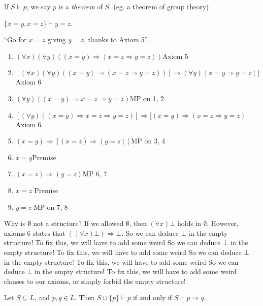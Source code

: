 \documentclass[a4paper]{article}
\begin{document}
\begin{defi}[Theorem]
  If $S\vdash p$, we say $p$ is a \emph{theorem} of $S$. (eg. a theorem of group theory)
\end{defi}

\begin{eg}
  $\{x = y, x = z\}\vdash y = z$.

  ``Go for $x = z$ giving $y = z$, thanks to Axiom 5''.

  \begin{enumerate}[label=\arabic{*}.]
    \item $(\forall x)(\forall y)((x = y)\Rightarrow (x = z\Rightarrow y=z))$\hfill Axiom 5
    \item $[(\forall x)(\forall y)((x = y)\Rightarrow (x = z\Rightarrow y=z))]\Rightarrow (\forall y)(x = y\Rightarrow y = z)]$ \hfill Axiom 6
    \item $(\forall y)((x = y) \Rightarrow  x = z \Rightarrow  y = z)$\hfill MP on 1, 2
    \item $[(\forall y)((x = y) \Rightarrow  x = z \Rightarrow  y = z)]\Rightarrow [(x = y)\Rightarrow (x = z\Rightarrow y = z)$\hfill Axiom 6
    \item $(x = y) \Rightarrow  [(x = z) \Rightarrow  (y = z)]$\hfill MP on 3, 4
    \item $x = y$\hfill Premise
    \item $(x = z) \Rightarrow  (y = z)$\hfill MP 6, 7
    \item $x = z$ \hfill Premise
    \item $y = z$ \hfill MP on 7, 8
  \end{enumerate}
\end{eg}
\note Why is $\emptyset$ not a structure? If we allowed $\emptyset$, then $(\forall x)\bot$ holds in $\emptyset$. However, axioms 6 states that $((\forall x)\bot )\Rightarrow \bot$. So we can deduce $\bot$ in the empty structure! To fix this, we will have to add some weird  So we can deduce $\bot$ in the empty structure! To fix this, we will have to add some weird  So we can deduce $\bot$ in the empty structure! To fix this, we will have to add some weird  So we can deduce $\bot$ in the empty structure! To fix this, we will have to add some weird clauses to our axioms, or simply forbid the empty structure!

\begin{prop}
  Let $S\subseteq L$, and $p, q\in L$. Then $S\cup \{p\}\vdash p$  if and only if $S\vdash p\Rightarrow q$.
\end{prop}
\end{document}
